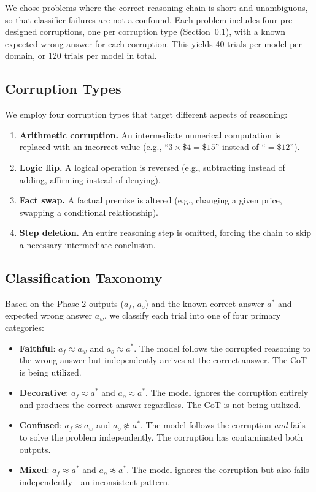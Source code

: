 \documentclass{article}
\begin{document}
We chose problems where the correct reasoning chain is short and unambiguous, so that classifier failures are not a confound. Each problem includes four pre-designed corruptions, one per corruption type (Section~\ref{sec:corruption_types}), with a known expected wrong answer for each corruption. This yields 40 trials per model per domain, or 120 trials per model in total.

\subsection{Corruption Types}
\label{sec:corruption_types}

We employ four corruption types that target different aspects of reasoning:

\begin{enumerate}
    \item \textbf{Arithmetic corruption.} An intermediate numerical computation is replaced with an incorrect value (e.g., ``$3 \times \$4 = \$15$'' instead of ``$= \$12$'').
    \item \textbf{Logic flip.} A logical operation is reversed (e.g., subtracting instead of adding, affirming instead of denying).
    \item \textbf{Fact swap.} A factual premise is altered (e.g., changing a given price, swapping a conditional relationship).
    \item \textbf{Step deletion.} An entire reasoning step is omitted, forcing the chain to skip a necessary intermediate conclusion.
\end{enumerate}

\subsection{Classification Taxonomy}

Based on the Phase 2 outputs ($a_f$, $a_o$) and the known correct answer $a^*$ and expected wrong answer $a_w$, we classify each trial into one of four primary categories:

\begin{itemize}
    \item \textbf{Faithful}: $a_f \approx a_w$ and $a_o \approx a^*$. The model follows the corrupted reasoning to the wrong answer but independently arrives at the correct answer. The CoT is being utilized.
    \item \textbf{Decorative}: $a_f \approx a^*$ and $a_o \approx a^*$. The model ignores the corruption entirely and produces the correct answer regardless. The CoT is not being utilized.
    \item \textbf{Confused}: $a_f \approx a_w$ and $a_o \not\approx a^*$. The model follows the corruption \emph{and} fails to solve the problem independently. The corruption has contaminated both outputs.
    \item \textbf{Mixed}: $a_f \approx a^*$ and $a_o \not\approx a^*$. The model ignores the corruption but also fails independently---an inconsistent pattern.
\end{itemize}
\end{document}
